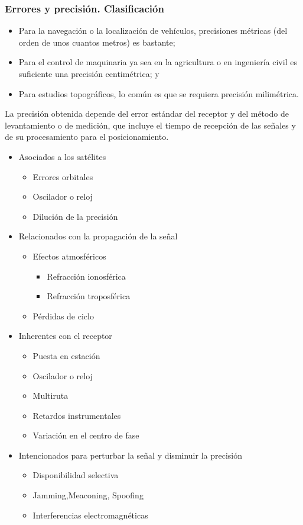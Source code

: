 \subsubsection{Errores y precisión. Clasificación}

\begin{itemize}
    \item Para la navegación o la localización de vehículos, precisiones métricas (del orden de unos cuantos metros) es bastante;
    \item Para el control de maquinaria ya sea en la agricultura o en ingeniería civil es suficiente una precisión centimétrica; y
    \item Para estudios topográficos, lo común es que se requiera precisión milimétrica.
\end{itemize}
La precisión obtenida depende del error estándar del receptor y del método de levantamiento o de medición, que incluye el tiempo de recepción de las señales y de su procesamiento para el posicionamiento.

\begin{itemize}
    \item Asociados a los satélites
    \begin{itemize}
        \item Errores orbitales
        \item Oscilador o reloj
        \item Dilución de la precisión
    \end{itemize}
    \item Relacionados con la propagación de la señal
    \begin{itemize}
        \item Efectos atmosféricos
        \begin{itemize}
            \item Refracción ionosférica
            \item Refracción troposférica
        \end{itemize}
        \item Pérdidas de ciclo
    \end{itemize}
    \item Inherentes con el receptor
    \begin{itemize}
        \item Puesta en estación
        \item Oscilador o reloj
        \item Multiruta
        \item Retardos instrumentales
        \item Variación en el centro de fase
    \end{itemize}
    \item Intencionados para perturbar la señal y disminuir la precisión
    \begin{itemize}
        \item Disponibilidad selectiva
        \item Jamming,Meaconing, Spoofing
        \item Interferencias electromagnéticas
    \end{itemize}
\end{itemize}

